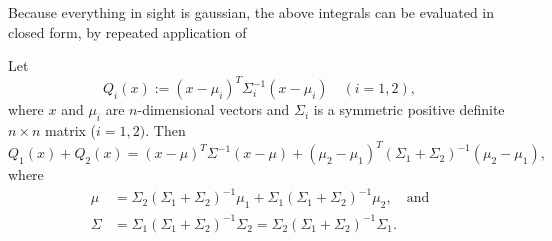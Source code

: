\documentclass[12pt,leqno]{article}
\begin{document}
Because everything in sight is gaussian, the above integrals can be evaluated in closed form, by repeated application of
 \begin{Lem}\label{comp_sq:1}
  Let
  $$
  Q_i(x) := (x-\mu_i)^T\Sigma_i^{-1}(x-\mu_i)\quad(i = 1,2),
  $$
  where $x$ and $\mu_i$ are $n$-dimensional vectors and $\Sigma_i$ is a symmetric positive definite $n\times{n}$
  matrix ($i = 1,2)$. Then
  $$
  Q_1(x) + Q_2(x) = (x-\mu)^T\Sigma^{-1}(x-\mu) + (\mu_2-\mu_1)^T(\Sigma_1+\Sigma_2)^{-1}(\mu_2-\mu_1),
  $$
  where
  \begin{align}
    \mu &= \Sigma_2(\Sigma_1+\Sigma_2)^{-1}\mu_1+\Sigma_1(\Sigma_1+\Sigma_2)^{-1}\mu_2,\quad\text{and}\label{mu}\\
    \Sigma &= \Sigma_1(\Sigma_1 + \Sigma_2)^{-1}\Sigma_2 = \Sigma_2(\Sigma_1 + \Sigma_2)^{-1}\Sigma_1\label{sigma}.
  \end{align}
\end{Lem}
\end{document}
